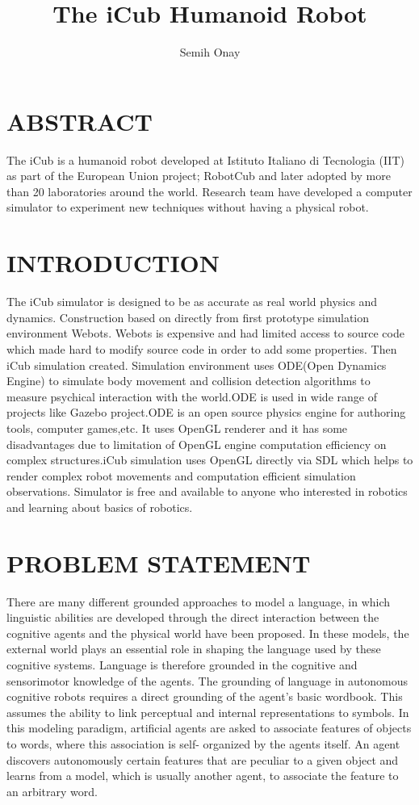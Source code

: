 \documentclass[reqno,12pt,oneside]{report}
\title{The iCub Humanoid Robot}
\author{Semih Onay}
\begin{document}
\makecstitle

\chapter*{ABSTRACT}
The iCub is a humanoid robot developed at Istituto Italiano di Tecnologia (IIT) as part of the European Union project; RobotCub and later adopted by more than 20 laboratories around the world. Research team have developed a computer simulator to experiment new techniques without having a physical robot.\cite{iCub}

\chapter{INTRODUCTION}
The iCub simulator is designed to be as accurate as real world physics and dynamics. Construction based on directly from first prototype simulation environment Webots\cite{webots}. Webots is expensive and had limited access to source code which made hard to modify source code in order to add some properties. Then iCub simulation created. Simulation environment uses ODE(Open Dynamics Engine)\cite{ode} to simulate body movement and collision detection algorithms to measure psychical interaction with the world.ODE is used in wide range of projects like Gazebo project.\cite{gazebo}ODE is an open source physics engine for authoring tools, computer games,etc. It uses OpenGL renderer and it has some disadvantages due to limitation of OpenGL engine computation efficiency on complex structures.iCub simulation uses OpenGL directly via SDL which helps to render complex robot movements and computation efficient simulation observations.\cite{sdl} Simulator is free and available to anyone who interested in robotics and learning about basics of robotics.\newpage

\chapter{PROBLEM STATEMENT}

There are many different grounded approaches to model a language, in which linguistic abilities are developed through the direct interaction between the cognitive agents and the physical world have been proposed. In these models, the external world plays an essential role in shaping the language used by these cognitive systems. Language is therefore grounded in the cognitive and sensorimotor knowledge of the agents.\cite{cag} The grounding of language in autonomous cognitive robots requires a direct grounding of the agent’s basic wordbook. This assumes the ability to link perceptual and internal representations to symbols. In this modeling paradigm, artificial agents are asked to associate features of objects to words, where this association is self- organized by the agents itself. An agent discovers autonomously certain features that are peculiar to a given object and learns from a model, which is usually another agent, to associate the feature to an arbitrary word.
\end{document}
